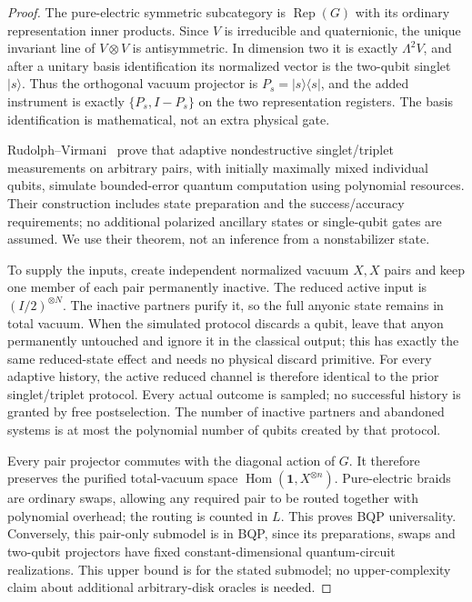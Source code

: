 \documentclass[11pt]{amsart}
\theoremstyle{definition}\newtheorem{definition}[theorem]{Definition}
\newcommand{\one}{\mathbf1}
\newcommand{\Hom}{\operatorname{Hom}}
\begin{document}
\begin{proof}
The pure-electric symmetric subcategory is $\operatorname{Rep}(G)$ with its
ordinary representation inner products. Since $V$ is irreducible and
quaternionic, the unique invariant line of $V\otimes V$ is antisymmetric.
In dimension two it is exactly $\Lambda^2V$, and after a unitary basis
identification its normalized vector is the two-qubit singlet $|s\rangle$.
Thus the orthogonal vacuum projector is $P_s=|s\rangle\langle s|$,
and the added instrument is exactly $\{P_s,I-P_s\}$ on the two representation
registers. The basis identification is mathematical, not an extra physical gate.

Rudolph--Virmani~\cite{RV} prove that adaptive nondestructive singlet/triplet
measurements on arbitrary pairs, with initially maximally mixed individual
qubits, simulate bounded-error quantum computation using polynomial resources.
Their construction includes state preparation and the success/accuracy
requirements; no additional polarized ancillary states or single-qubit gates
are assumed. We use their theorem, not an inference from a nonstabilizer state.

To supply the inputs, create independent normalized vacuum $X,X$ pairs and
keep one member of each pair permanently inactive. The reduced active input
is $(I/2)^{\otimes N}$. The inactive partners purify it, so the full anyonic
state remains in total vacuum. When the simulated protocol discards a qubit,
leave that anyon permanently untouched and ignore it in the classical output;
this has exactly the same reduced-state effect and needs no physical discard
primitive. For every adaptive history, the active reduced channel is therefore
identical to the prior singlet/triplet protocol. Every actual outcome is sampled;
no successful history is granted by free postselection. The number of inactive
partners and abandoned systems is at most the polynomial number of qubits
created by that protocol.

Every pair projector commutes with the diagonal action of $G$. It therefore
preserves the purified total-vacuum space $\Hom(\one,X^{\otimes n})$.
Pure-electric braids are ordinary
swaps, allowing any required pair to be routed together with polynomial
overhead; the routing is counted in $L$. This proves BQP universality.
Conversely, this pair-only submodel is in BQP, since its preparations, swaps
and two-qubit projectors have fixed constant-dimensional quantum-circuit
realizations. This upper bound is for the stated submodel; no upper-complexity
claim about additional arbitrary-disk oracles is needed.
\end{proof}
\end{document}
